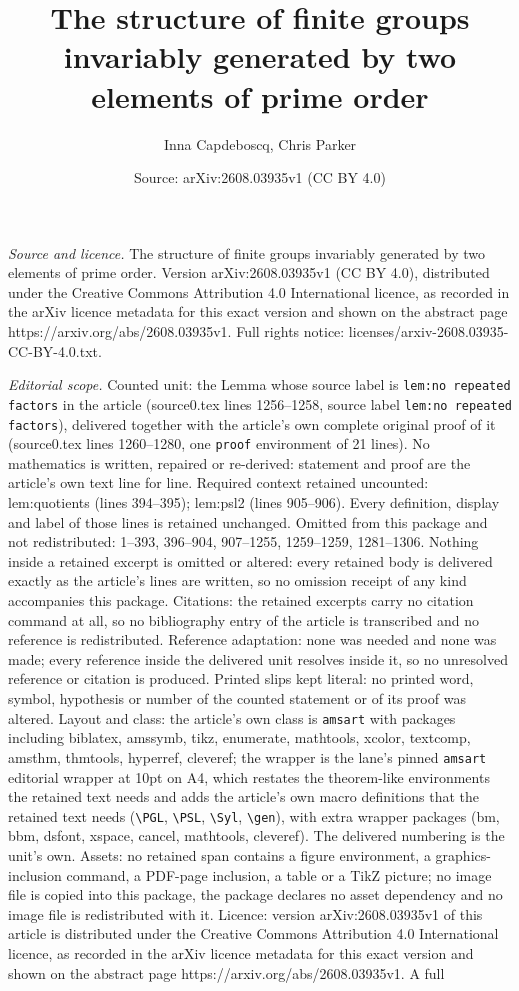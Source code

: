 \documentclass[10pt,a4paper]{amsart}
\title[The structure of finite groups invariably generated by two e]{The structure of finite groups invariably generated by two elements of prime order}
\author{Inna Capdeboscq, Chris Parker}
\date{Source: arXiv:2608.03935v1 (CC BY 4.0)}
\begin{document}
\maketitle

\noindent\emph{Source and licence.} The structure of finite groups invariably generated by two elements of prime order. Version arXiv:2608.03935v1 (CC BY 4.0), distributed under the Creative Commons Attribution 4.0 International licence, as recorded in the arXiv licence metadata for this exact version and shown on the abstract page https://arxiv.org/abs/2608.03935v1. Full rights notice: licenses/arxiv-2608.03935-CC-BY-4.0.txt.\par\smallskip

\noindent\textit{Editorial scope.} Counted unit: the Lemma whose source label is \texttt{lem:no repeated factors} in the article (source0.tex lines 1256--1258, source label \texttt{lem:no repeated factors}), delivered together with the article's own complete original proof of it (source0.tex lines 1260--1280, one \texttt{proof} environment of 21 lines). No mathematics is written, repaired or re-derived: statement and proof are the article's own text line for line. Required context retained uncounted: lem:quotients (lines 394--395); lem:psl2 (lines 905--906). Every definition, display and label of those lines is retained unchanged. Omitted from this package and not redistributed: 1--393, 396--904, 907--1255, 1259--1259, 1281--1306. Nothing inside a retained excerpt is omitted or altered: every retained body is delivered exactly as the article's lines are written, so no omission receipt of any kind accompanies this package. Citations: the retained excerpts carry no citation command at all, so no bibliography entry of the article is transcribed and no reference is redistributed. Reference adaptation: none was needed and none was made; every reference inside the delivered unit resolves inside it, so no unresolved reference or citation is produced. Printed slips kept literal: no printed word, symbol, hypothesis or number of the counted statement or of its proof was altered. Layout and class: the article's own class is \texttt{amsart} with packages including biblatex, amssymb, tikz, enumerate, mathtools, xcolor, textcomp, amsthm, thmtools, hyperref, cleveref; the wrapper is the lane's pinned \texttt{amsart} editorial wrapper at 10pt on A4, which restates the theorem-like environments the retained text needs and adds the article's own macro definitions that the retained text needs (\texttt{\textbackslash PGL}, \texttt{\textbackslash PSL}, \texttt{\textbackslash Syl}, \texttt{\textbackslash gen}), with extra wrapper packages (bm, bbm, dsfont, xspace, cancel, mathtools, cleveref). The delivered numbering is the unit's own. Assets: no retained span contains a figure environment, a graphics-inclusion command, a PDF-page inclusion, a table or a TikZ picture; no image file is copied into this package, the package declares no asset dependency and no image file is redistributed with it. Licence: version arXiv:2608.03935v1 of this article is distributed under the Creative Commons Attribution 4.0 International licence, as recorded in the arXiv licence metadata for this exact version and shown on the abstract page https://arxiv.org/abs/2608.03935v1. A full 
\end{document}
